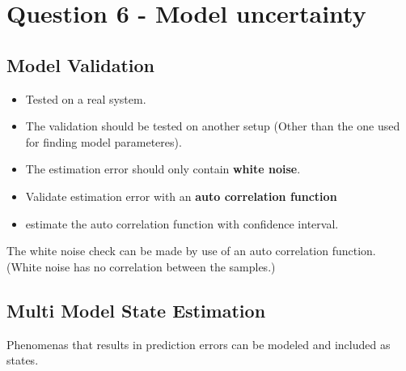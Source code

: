 \chapter{Question 6 - Model uncertainty}

\section*{Model Validation}
\begin{itemize}
         \item Tested on a real system.
         \item The validation should be tested on another setup (Other than the one used for finding model parameteres).
         \item The estimation error should only contain \textbf{white noise}.
         \item Validate estimation error with an \textbf{auto correlation function}
         \item estimate the auto correlation function with confidence interval.
 \end{itemize} 


The white noise check can be made by use of an auto correlation function. (White noise has no correlation between the samples.)


\section*{Multi Model State Estimation}
Phenomenas that results in prediction errors can be modeled and included as states. 

